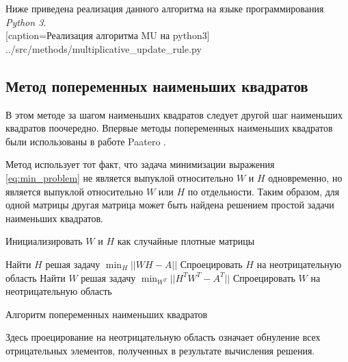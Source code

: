 \newpage

Ниже приведена реализация данного алгоритма на языке программирования \textit{Python 3}.
\\


  [caption=Реализация алгоритма MU на python3]
  {../src/methods/multiplicative_update_rule.py}



\newpage



\subsection{Метод попеременных наименьших квадратов}

В этом методе за шагом наименьших квадратов следует другой шаг наименьших квадратов поочередно.
Впервые методы попеременных наименьших квадратов были использованы в работе Paatero \cite{paatero}.

Метод использует тот факт, что задача минимизации выражения \eqref{eq:min_problem} не является выпуклой относительно $W$ и $H$ одновременно,
но является выпуклой относительно $W$ или $H$ по отдельности.
Таким образом, для одной матрицы другая матрица может быть найдена решением простой задачи наименьших квадратов.

\begin{algorithm}
  \BlankLine
  \BlankLine


  \BlankLine

  Инициализировать  $W$ и $H$ как случайные плотные матрицы\;

   {
    Найти $H$ решая задачу $\displaystyle\min_H||WH - A||$\; \label{alg:line:lstsq_1}
    Спроецировать $H$ на неотрицательную область\;
    Найти $W$ решая задачу $\displaystyle\min_{W^T}||H^TW^T - A^T||$\; \label{alg:line:lstsq_2}
    Спроецировать $W$ на неотрицательную область\;
  }

  \BlankLine

  \caption{Алгоритм попеременных наименьших квадратов}
\end{algorithm}


Здесь проецирование на неотрицательную область означает обнуление всех отрицательных элементов, полученных в результате
вычисления решения.


